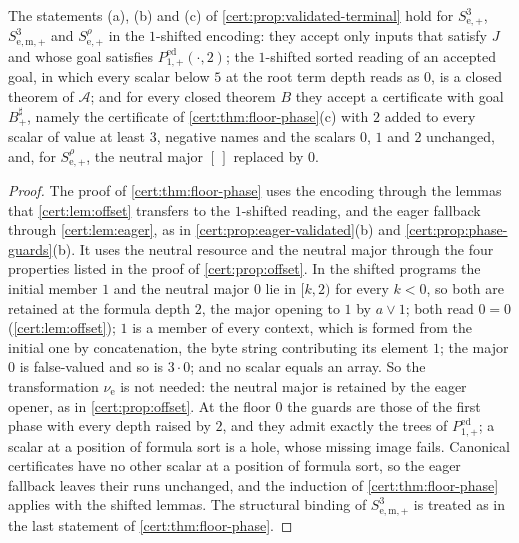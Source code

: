 \begin{proposition}\label{cert:prop:shifted-strict}
The statements (a), (b) and (c) of \cref{cert:prop:validated-terminal} hold for
$S^{3}_{\mathrm e,+}$, $S^{3}_{\mathrm{e,m},+}$ and $S^{\rho}_{\mathrm e,+}$ in the $1$-shifted
encoding: they accept only inputs that satisfy $J$ and whose goal satisfies
$P^{\mathrm{ed}}_{1,+}(\cdot,2)$; the $1$-shifted sorted reading of an accepted goal, in which
every scalar below $5$ at the root term depth reads as $0$, is a closed theorem of $\mathcal A$;
and for every closed theorem $B$ they accept a certificate with goal $B^{\sharp}_{+}$, namely
the certificate of \cref{cert:thm:floor-phase}(c) with $2$ added to every scalar of value at
least $3$, negative names and the scalars $0$, $1$ and $2$ unchanged, and, for
$S^{\rho}_{\mathrm e,+}$, the neutral major $[\,]$ replaced by $0$.
\end{proposition}
\begin{proof}
The proof of \cref{cert:thm:floor-phase} uses the encoding through the lemmas that
\cref{cert:lem:offset} transfers to the $1$-shifted reading, and the eager fallback through
\cref{cert:lem:eager}, as in \cref{cert:prop:eager-validated}(b) and
\cref{cert:prop:phase-guards}(b). It uses the neutral resource and the neutral major through the
four properties listed in the proof of \cref{cert:prop:offset}. In the shifted programs the
initial member $1$ and the neutral major $0$ lie in $[k,2)$ for every $k<0$, so both are retained
at the formula depth $2$, the major opening to $1$ by $a\lor 1$; both read $0=0$
(\cref{cert:lem:offset}); $1$ is a member of every context, which is formed from the initial one
by concatenation, the byte string contributing its element $1$; the major $0$ is false-valued and
so is $3\cdot 0$; and no scalar equals an array. So the transformation $\nu_{\mathrm e}$ is not
needed: the neutral major is retained by the eager opener, as in \cref{cert:prop:offset}. At the
floor $0$ the guards are those of the first phase with every depth raised by $2$, and they admit
exactly the trees of $P^{\mathrm{ed}}_{1,+}$; a scalar at a position of formula sort is a hole,
whose missing image fails. Canonical certificates have no other scalar at a position of formula
sort, so the eager fallback leaves their runs unchanged, and the induction of
\cref{cert:thm:floor-phase} applies with the shifted lemmas. The structural binding of
$S^{3}_{\mathrm{e,m},+}$ is treated as in the last statement of \cref{cert:thm:floor-phase}.
\end{proof}

